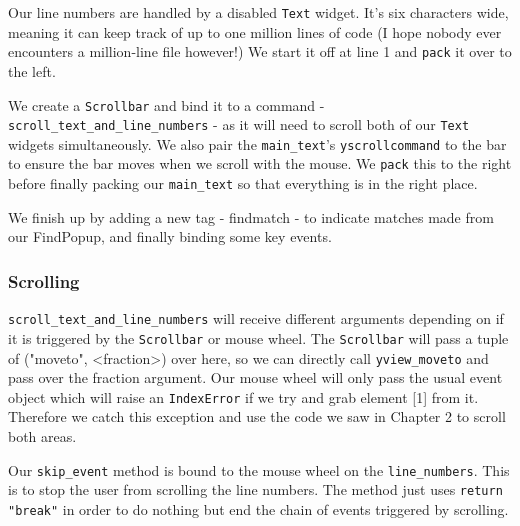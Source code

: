 \documentclass[a4paper,11pt,openany]{book}
\begin{document}
\vspace{5mm}

Our line numbers are handled by a disabled \lstinline[columns=fixed]{Text} widget. It's six characters wide, meaning it can keep track of up to one million lines of code (I hope nobody ever encounters a million-line file however!) We start it off at line 1 and \lstinline[columns=fixed]{pack} it over to the left. 

\vspace{5mm}

We create a \lstinline[columns=fixed]{Scrollbar} and bind it to a command - \lstinline[columns=fixed]{scroll_text_and_line_numbers} - as it will need to scroll both of our \lstinline[columns=fixed]{Text} widgets simultaneously. We also pair the \lstinline[columns=fixed]{main_text}'s \lstinline[columns=fixed]{yscrollcommand} to the bar to ensure the bar moves when we scroll with the mouse. We \lstinline[columns=fixed]{pack} this to the right before finally packing our \lstinline[columns=fixed]{main_text} so that everything is in the right place.

\vspace{5mm}

We finish up by adding a new tag - findmatch - to indicate matches made from our FindPopup, and finally binding some key events.  

\subsubsection{Scrolling}

\lstinline[columns=fixed]{scroll_text_and_line_numbers} will receive different arguments depending on if it is triggered by the \lstinline[columns=fixed]{Scrollbar} or mouse wheel. The \lstinline[columns=fixed]{Scrollbar} will pass a tuple of ("moveto", <fraction>) over here, so we can directly call \lstinline[columns=fixed]{yview_moveto} and pass over the fraction argument. Our mouse wheel will only pass the usual event object which will raise an \lstinline[columns=fixed]{IndexError} if we try and grab element [1] from it. Therefore we catch this exception and use the code we saw in Chapter 2 to scroll both areas. 

\vspace{5mm}

Our \lstinline[columns=fixed]{skip_event} method is bound to the mouse wheel on the \lstinline[columns=fixed]{line_numbers}. This is to stop the user from scrolling the line numbers. The method just uses \lstinline[columns=fixed]{return "break"} in order to do nothing but end the chain of events triggered by scrolling. 
\end{document}
